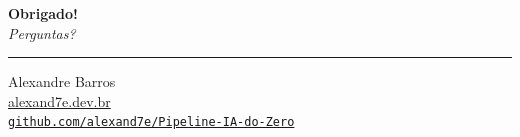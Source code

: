 \documentclass[aspectratio=169]{beamer}
\begin{document}
\begin{frame}
\begin{center}
  \vfill
  {\Large \textbf{Obrigado!}}\\[12pt]
  \textit{Perguntas?}\\[20pt]
  \hrule
  \vspace{10pt}
  \small
  Alexandre Barros\\
  \href{https://alexand7e.dev.br}{alexand7e.dev.br}\\[4pt]
  \href{https://github.com/alexand7e/Pipeline-IA-do-Zero}{\texttt{github.com/alexand7e/Pipeline-IA-do-Zero}}
  \vfill
\end{center}
\end{frame}
\end{document}
